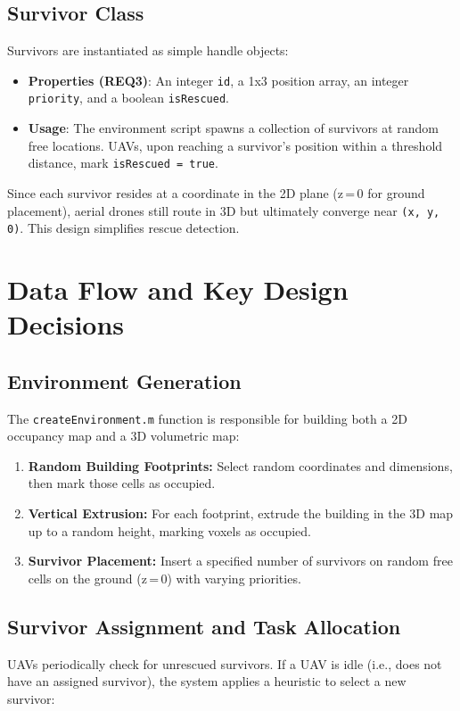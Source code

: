 \documentclass[12pt,a4paper]{report}
\begin{document}
\subsection{Survivor Class}
\label{sec:survivor_class}
Survivors are instantiated as simple handle objects:

\begin{itemize}
    \item \textbf{Properties (REQ3)}: 
          An integer \texttt{id}, a 1x3 position array, an integer \texttt{priority},
          and a boolean \texttt{isRescued}.
    \item \textbf{Usage}:
          The environment script spawns a collection of survivors at random free locations.
          UAVs, upon reaching a survivor’s position within a threshold distance, mark
          \texttt{isRescued = true}.
\end{itemize}

Since each survivor resides at a coordinate in the 2D plane (z\,=\,0 for ground placement),
aerial drones still route in 3D but ultimately converge near \texttt{(x, y, 0)}. This design
simplifies rescue detection.

\section{Data Flow and Key Design Decisions}
\label{sec:dataflow_design}
\subsection{Environment Generation}
\label{sec:env_gen}
The \texttt{createEnvironment.m} function is responsible for building both a 2D occupancy map
and a 3D volumetric map:

\begin{enumerate}
    \item \textbf{Random Building Footprints:} 
          Select random coordinates and dimensions, then mark those cells as occupied.
    \item \textbf{Vertical Extrusion:}
          For each footprint, extrude the building in the 3D map up to a random height,
          marking voxels as occupied.
    \item \textbf{Survivor Placement:}
          Insert a specified number of survivors on random free cells on the ground
          (z\,=\,0) with varying priorities.
\end{enumerate}

\subsection{Survivor Assignment and Task Allocation}
\label{sec:survivor_allocation}
UAVs periodically check for unrescued survivors. If a UAV is idle (i.e., does not have
an assigned survivor), the system applies a heuristic to select a new survivor:
\end{document}

